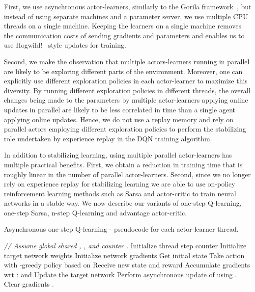 \documentclass{article} \usepackage{times}
\begin{document}
First, we use asynchronous actor-learners, similarly to the Gorila framework~\citep{nair2015gorila}, but instead of using separate machines and a parameter server, we use multiple CPU threads on a single machine.
Keeping the learners on a single machine removes the communication costs of sending gradients and parameters and enables us to use Hogwild!~\citep{recht2011hogwild} style updates for training.

Second, we make the observation that multiple actors-learners running in parallel are likely to be exploring different parts of the environment.
Moreover, one can explicitly use different exploration policies in each actor-learner to maximize this diversity.
By running different exploration policies in different threads, the overall changes being made to the parameters by multiple actor-learners applying online updates in parallel are likely to be less correlated in time than a single agent applying online updates.
Hence, we do not use a replay memory and rely on parallel actors employing different exploration policies to perform the stabilizing role undertaken by experience replay in the DQN training algorithm.

In addition to stabilizing learning, using multiple parallel actor-learners has multiple practical benefits.
First, we obtain a reduction in training time that is roughly linear in the number of parallel actor-learners.
Second, since we no longer rely on experience replay for stabilizing learning we are able to use on-policy reinforcement learning methods such as Sarsa and actor-critic to train neural networks in a stable way.
We now describe our variants of one-step Q-learning, one-step Sarsa, n-step Q-learning and advantage actor-critic.




\begin{algorithm}[t]
\caption{Asynchronous one-step Q-learning - pseudocode for each actor-learner thread.}
\begin{algorithmic}
\small
\State \emph{// Assume global shared , , and counter .}
\State Initialize thread step counter 
\State Initialize target network weights 
\State Initialize network gradients 
\State Get initial state 
\Repeat
\State Take action  with -greedy policy based on 
\State Receive new state  and reward 
\State 
\State Accumulate gradients wrt : 
\State 
\State  and 
\If {}
\State Update the target network  
\EndIf
{}
\State Perform asynchronous update of  using .
\State Clear gradients .
\EndIf
\Until 
\end{algorithmic}
\label{alg:targetq}
\end{algorithm}
\end{document}
